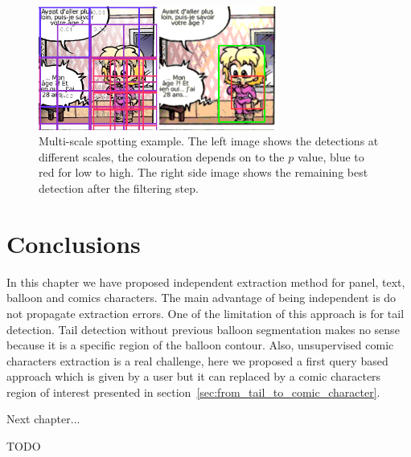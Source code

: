  \begin{figure}[!ht]  %
   \centering
  \includegraphics[trim= 0px 1px 0mm 0mm, clip,width=0.7\textwidth]{filtering.png}
  \caption[Multi-scale comic character spotting]{Multi-scale spotting example. The left image shows the detections at different scales, the colouration depends on to the $p$ value, blue to red for low to high. The right side image shows the remaining best detection after the filtering step. }
  \label{fig:in:filtering}
 \end{figure}



\section{Conclusions}
\label{sec:in:conclusion}

In this chapter we have proposed independent extraction method for panel, text, balloon and comics characters.
The main advantage of being independent is do not propagate extraction errors.
One of the limitation of this approach is for tail detection.
Tail detection without previous balloon segmentation makes no sense because it is a specific region of the balloon contour.
Also, unsupervised comic characters extraction is a real challenge, here we proposed a first query based approach which is given by a user but it can replaced by a comic characters region of interest presented in section~\ref{sec:from_tail_to_comic_character}.

Next chapter...

TODO

